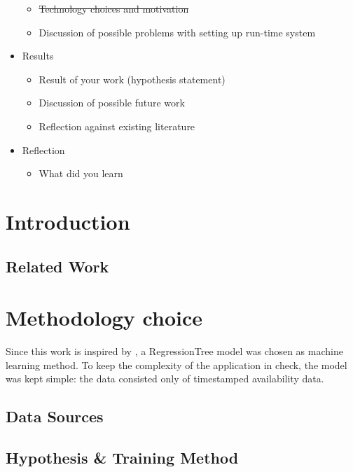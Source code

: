 \documentclass[journal,10pt]{IEEEtran}
\begin{document}
\begin{itemize}
\begin{itemize}
    \item \st{Technology choices and motivation}
    \item Discussion of possible problems with setting up run-time system
  \end{itemize}
  \item Results
  \begin{itemize}
    \item Result of your work (hypothesis statement)
    \item Discussion of possible future work
    \item Reflection against existing literature
  \end{itemize}
  \item Reflection
  \begin{itemize}
    \item What did you learn
  \end{itemize}
\end{itemize}






\section{Introduction}



\subsection{Related Work}



\section{Methodology choice}

Since this work is inspired by \cite{parkendd}, a RegressionTree model was chosen as machine learning method. To keep the complexity of the application in check, the model was kept simple: the data consisted only of timestamped availability data.

\subsection{Data Sources}\label{data sources}


\subsection{Hypothesis \& Training Method}\label{sec:training_model}

\end{document}
